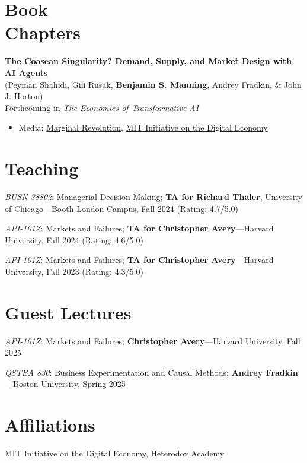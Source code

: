 \documentclass[margin,line,pifont,palatino,courier, 9pt]{res}
\begin{document}
\begin{resume}
\section{\sc Book\\Chapters}
\href{https://www.nber.org/books-and-chapters/economics-transformative-ai/coasean-singularity-demand-supply-and-market-design-ai-agents}{\bf The Coasean Singularity? Demand, Supply, and Market Design with AI Agents}\\
(Peyman Shahidi\footnotemark[\value{footnote}], Gili Rusak\footnotemark[\value{footnote}], \textbf{Benjamin S. Manning}\footnotemark[\value{footnote}], Andrey Fradkin\footnotemark[\value{footnote}], \& John J. Horton\footnotemark[\value{footnote}])\\
Forthcoming in \textit{The Economics of Transformative AI}
\vspace{0.25cm}
\begin{itemize}
\item Media: \href{https://marginalrevolution.com/marginalrevolution/2025/10/will-there-be-a-coasean-singularity.html}{Marginal Revolution}, \href{https://ide.mit.edu/insights/how-ai-agents-for-commerce-could-shape-future-markets/}{MIT Initiative on the Digital Economy}
\end{itemize}

\section{\sc Teaching}
\textit{BUSN 38802}: Managerial Decision Making; \textbf{TA for Richard Thaler}, University of Chicago---Booth London Campus, Fall 2024 (Rating: 4.7/5.0)

\textit{API-101Z}: Markets and Failures; \textbf{TA for Christopher Avery}---Harvard University, Fall 2024 (Rating: 4.6/5.0)

\textit{API-101Z}: Markets and Failures; \textbf{TA for Christopher Avery}---Harvard University, Fall 2023 (Rating: 4.3/5.0)

\section{\sc Guest Lectures}
\textit{API-101Z}: Markets and Failures; \textbf{Christopher Avery}---Harvard University, Fall 2025

\textit{QSTBA 830}: Business Experimentation and Causal Methods; \textbf{Andrey Fradkin}---Boston University, Spring 2025

\section{\sc Affiliations}
MIT Initiative on the Digital Economy, Heterodox Academy


\end{resume}
\end{document}
